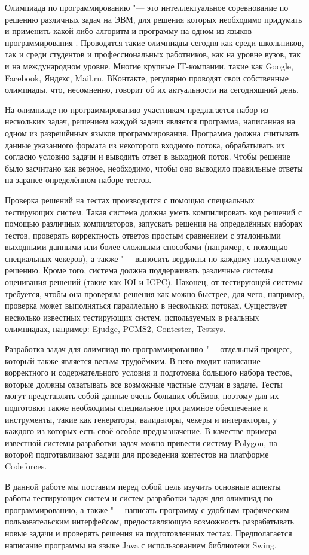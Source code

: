 Олимпиада по программированию "--- это интеллектуальное соревнование по решению различных задач на ЭВМ, для решения которых необходимо придумать и применить какой-либо алгоритм и программу на одном из языков программирования \cite{wiki_olymp}. Проводятся такие олимпиады сегодня как среди школьников, так и среди студентов и профессиональных работников, как на уровне вузов, так и на международном уровне. Многие крупные IT-компании, такие как Google, Facebook, Яндекс, Mail.ru, ВКонтакте, регулярно проводят свои собственные олимпиады, что, несомненно, говорит об их актуальности на сегодняшний день.

На олимпиаде по программированию участникам предлагается набор из нескольких задач, решением каждой задачи является программа, написанная на одном из разрешённых языков программирования. Программа должна считывать данные указанного формата из некоторого входного потока, обрабатывать их согласно условию задачи и выводить ответ в выходной поток. Чтобы решение было засчитано как верное, необходимо, чтобы оно выводило правильные ответы на заранее определённом наборе тестов.

Проверка решений на тестах производится с помощью специальных тестирующих систем. Такая система должна уметь компилировать код решений с помощью различных компиляторов, запускать решения на определённых наборах тестов, проверять корректность ответов простым сравнением с эталонными выходными данными или более сложными способами (например, с помощью специальных чекеров), а также "--- выносить вердикты по каждому полученному решению. Кроме того, система должна поддерживать различные системы оценивания решений (такие как IOI и ICPC). Наконец, от тестирующей системы требуется, чтобы она проверяла решения как можно быстрее, для чего, например, проверка может выполняться параллельно в нескольких потоках. Существует несколько известных тестирующих систем, используемых в реальных олимпиадах, например: Ejudge, PCMS2, Contester, Testsys.

Разработка задач для олимпиад по программированию "--- отдельный процесс, который также является весьма трудоёмким. В него входит написание корректного и содержательного условия и подготовка большого набора тестов, которые должны охватывать все возможные частные случаи в задаче. Тесты могут представлять собой данные очень больших объёмов, поэтому для их подготовки также необходимы специальное программное обеспечение и инструменты, такие как генераторы, валидаторы, чекеры и интеракторы, у каждого из которых есть своё особое предназначение. В качестве примера известной системы разработки задач можно привести систему Polygon, на которой подготавливают задачи для проведения контестов на платформе Codeforces.

В данной работе мы поставим перед собой цель изучить основные аспекты работы тестирующих систем и систем разработки задач для олимпиад по программированию, а также "--- написать программу с удобным графическим пользовательским интерфейсом, предоставляющую возможность разрабатывать новые задачи и проверять решения на подготовленных тестах. Предполагается написание программы на языке Java с использованием библиотеки Swing.